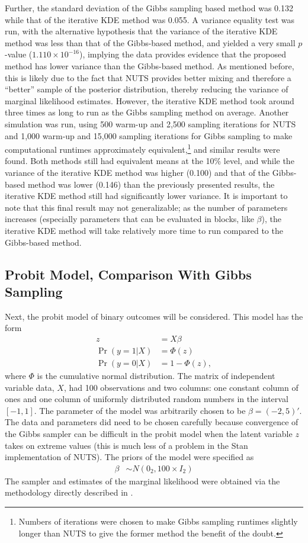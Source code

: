 \documentclass[twocolumn]{article}
\begin{document}
Further, the standard deviation of the Gibbs sampling based method was 0.132 while that of the iterative KDE method was 0.055. A variance equality test was run, with the alternative hypothesis that the variance of the iterative KDE method was less than that of the Gibbs-based method, and yielded a very small $p$-value ($1.110 \times 10^{-16}$), implying the data provides evidence that the proposed method has lower variance than the Gibbs-based method. As mentioned before, this is likely due to the fact that NUTS provides better mixing and therefore a ``better'' sample of the posterior distribution, thereby reducing the variance of marginal likelihood estimates. However, the iterative KDE method took around three times as long to run as the Gibbs sampling method on average. Another simulation was run, using 500 warm-up and 2,500 sampling iterations for NUTS and 1,000 warm-up and 15,000 sampling iterations for Gibbs sampling to make computational runtimes approximately equivalent,\footnote{Numbers of iterations were chosen to make Gibbs sampling runtimes slightly longer than NUTS to give the former method the benefit of the doubt.} and similar results were found. Both methods still had equivalent means at the 10\% level, and while the variance of the iterative KDE method was higher (0.100) and that of the Gibbs-based method was lower (0.146) than the previously presented results, the iterative KDE method still had significantly lower variance. It is important to note that this final result may not generalizable; as the number of parameters increases (especially parameters that can be evaluated in blocks, like $\beta$), the iterative KDE method will take relatively more time to run compared to the Gibbs-based method.

\subsection{Probit Model, Comparison With Gibbs Sampling}

Next, the probit model of binary outcomes will be considered. This model has the form
\begin{align}
	z &= X\beta \\
	\Pr(y=1|X) &= \Phi(z) \\
	\Pr(y=0|X) &= 1 - \Phi(z),
\end{align}
where $\Phi$ is the cumulative normal distribution. The matrix of independent variable data, $X$, had 100 observations and two columns: one constant column of ones and one column of uniformly distributed random numbers in the interval $[-1, 1]$. The parameter of the model was arbitrarily chosen to be $\beta = (-2, 5)'$. The data and parameters did need to be chosen carefully because convergence of the Gibbs sampler can be difficult in the probit model when the latent variable $z$ takes on extreme values (this is much less of a problem in the Stan implementation of NUTS). The priors of the model were specified as
\begin{align}
	\beta &\sim N(0_2, 100 \times I_2)
\end{align}
The sampler and estimates of the marginal likelihood were obtained via the methodology directly described in \cite{Chib}.
\end{document}
